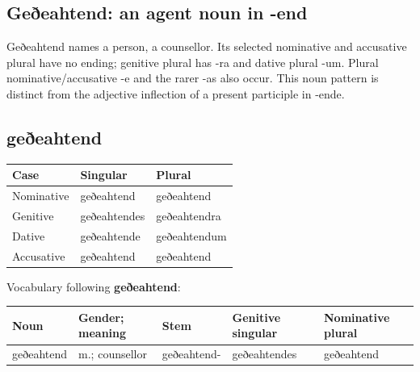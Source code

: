 \subsection*{Geðeahtend: an agent noun in -end}

Geðeahtend names a person, a counsellor. Its selected nominative and accusative plural have no ending; genitive plural has -ra and dative plural -um. Plural nominative/\allowbreak{}accusative -e and the rarer -as also occur. This noun pattern is distinct from the adjective inflection of a present participle in -ende.

\subsection*{geðeahtend}

\par\begingroup
\fontsize{10.5}{13.2}\selectfont
\setlength{\LTleft}{0pt}\setlength{\LTright}{\fill}
\noindent
\begin{tabular}{@{}>{\raggedright\arraybackslash}p{34.82mm}>{\raggedright\arraybackslash}p{41.78mm}>{\raggedright\arraybackslash}p{41.78mm}@{}}
\toprule
\textbf{Case} & \textbf{Singular} & \textbf{Plural} \\
\midrule
Nominative & geðeahtend & geðeahtend \\
Genitive & geðeahtendes & geðeahtendra \\
Dative & geðeahtende & geðeahtendum \\
Accusative & geðeahtend & geðeahtend \\
\bottomrule
\end{tabular}
\par\endgroup

Vocabulary following \textbf{geðeahtend}:

\par\begingroup
\fontsize{10.5}{13.2}\selectfont
\setlength{\LTleft}{0pt}\setlength{\LTright}{\fill}
\noindent
\begin{tabular}{@{}>{\raggedright\arraybackslash}p{18.59mm}>{\raggedright\arraybackslash}p{22.77mm}>{\raggedright\arraybackslash}p{20.45mm}>{\raggedright\arraybackslash}p{26.49mm}>{\raggedright\arraybackslash}p{24.45mm}@{}}
\toprule
\textbf{Noun} & \textbf{Gender; meaning} & \textbf{Stem} & \textbf{Genitive singular} & \textbf{Nominative plural} \\
\midrule
geðeahtend & m.; counsellor & geðeahtend- & geðeahtendes & geðeahtend \\
\bottomrule
\end{tabular}
\par\endgroup

